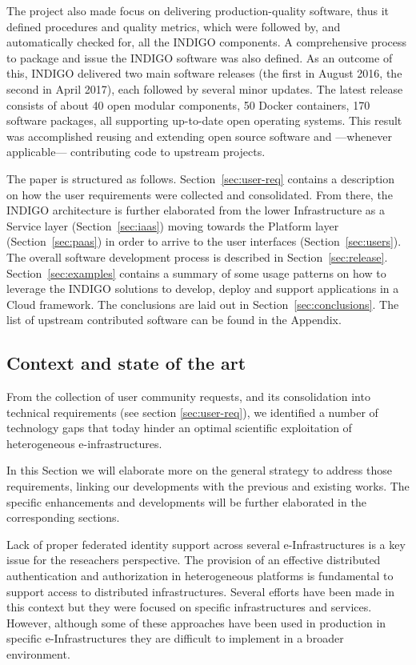 \documentclass{article}
\begin{document}
The project also made focus on delivering production-quality software, thus it
defined procedures and quality metrics, which were followed by, and
automatically checked for, all the INDIGO components. A comprehensive process
to package and issue the INDIGO software was also defined. As an outcome of
this, INDIGO delivered two main software releases (the first in August 2016,
the second in April 2017), each followed by several minor updates. The latest
release consists of about 40 open modular components, 50 Docker
containers, 170 software packages, all supporting up-to-date open operating
systems. This result was accomplished reusing and extending open source
software and ---whenever applicable--- contributing code to upstream projects.

The paper is structured as follows.
Section~\ref{sec:user-req} contains a description on how the user requirements
were collected and consolidated. From there, the INDIGO architecture is further
elaborated from the lower Infrastructure as a Service layer
(Section~\ref{sec:iaas}) moving towards the Platform layer
(Section~\ref{sec:paas}) in order to arrive to the user interfaces
(Section~\ref{sec:users}). The overall software development process is
described in Section~\ref{sec:release}. Section~\ref{sec:examples} contains a
summary of some usage patterns on how to leverage the INDIGO solutions to
develop, deploy and support applications in a Cloud framework. The conclusions
are laid out in Section~\ref{sec:conclusions}. The list of upstream contributed
software can be found in the Appendix.

\subsection{Context and state of the art}


From the collection of user community requests, and its consolidation into technical requirements (see section \ref{sec:user-req}), we identified a number of technology gaps that today hinder an optimal scientific exploitation of heterogeneous e-infrastructures.

In this Section we will elaborate more on the general strategy to address those requirements, linking our developments with the previous and existing works. The specific enhancements and developments will be further elaborated in the corresponding sections.

Lack of proper federated identity support across several e-Infrastructures is a key issue for the reseachers perspective. The provision of an effective distributed authentication and authorization in heterogeneous platforms is fundamental to support access to distributed infrastructures. Several efforts have been made in this context
\cite{LopezGarcia2013b,Chadwick2014,lee2014design,pustchi2015authorization,lee2014keystone}
but they were focused on specific infrastructures and services. However,
although some of these approaches have been used in production in specific
e-Infrastructures \cite{FernandezdelCastillo2015} they are difficult 
to implement in a broader environment. 
\end{document}
